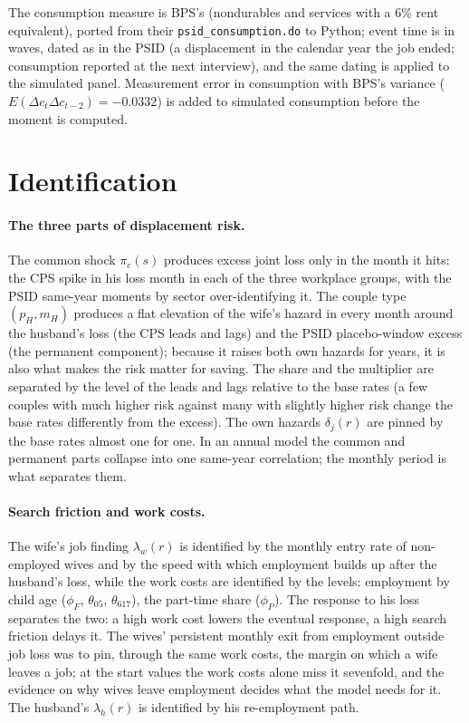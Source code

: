 \documentclass[11pt]{article}
\newcommand{\code}[1]{\texttt{#1}}
\newcommand{\1}{\mathbf{1}}
\begin{document}
\noindent The consumption measure is BPS's (nondurables and services with a 6\% rent equivalent), ported from their
\code{psid\_consumption.do} to Python; event time is in waves, dated as in the PSID (a displacement in the calendar year
the job ended; consumption reported at the next interview), and the same dating is applied to the simulated panel.
Measurement error in consumption with BPS's variance ($E(\Delta c_t\Delta c_{t-2}) = -0.0332$) is added to simulated
consumption before the moment is computed.

\section{Identification}\label{sec:ident}

\paragraph{The three parts of displacement risk.} The common shock $\pi_c(s)$ produces excess joint loss only in the
month it hits: the CPS spike in his loss month in each of the three workplace groups, with the PSID same-year moments by
sector over-identifying it. The couple type $(p_H, m_H)$ produces a flat elevation of the wife's hazard in every month around
the husband's loss (the CPS leads and lags) and the PSID placebo-window excess (the permanent component); because it
raises both own hazards for years, it is also what makes the risk matter for saving. The share and the multiplier are
separated by the level of the leads and lags relative to the base rates (a few couples with much higher risk against
many with slightly higher risk change the base rates differently from the excess). The own hazards $\delta_j(r)$ are
pinned by the base rates almost one for one. In an annual model the common and permanent parts collapse into one
same-year correlation; the monthly period is what separates them.

\paragraph{Search friction and work costs.} The wife's job finding $\lambda_w(r)$ is identified by the monthly entry
rate of non-employed wives and by the speed with which employment builds up after the husband's loss, while the work
costs are identified by the levels: employment by child age ($\phi_F$, $\theta_{05}$, $\theta_{617}$), the part-time
share ($\phi_P$). The response to his loss separates the two: a high work cost lowers the eventual response, a high search
friction delays it. The wives' persistent monthly exit from employment outside job loss was to pin, through the same
work costs, the margin on which a wife leaves a job; at the start values the work costs alone miss it sevenfold, and the
evidence on why wives leave employment decides what the model needs for it. The husband's $\lambda_h(r)$ is identified by his
re-employment path.
\end{document}

